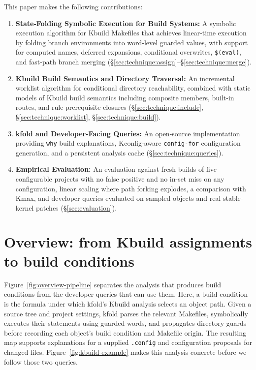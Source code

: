 \documentclass[acmsmall]{acmart}
\newcommand{\tool}{\textsf{kfold}\xspace}
\newcommand{\kmax}{\textsf{Kmax}\xspace}
\begin{document}
This paper makes the following contributions:
\begin{enumerate}
\item \textbf{State-Folding Symbolic Execution for Build Systems:} A symbolic execution algorithm for Kbuild Makefiles that achieves linear-time execution by folding branch environments into word-level guarded values, with support for computed names, deferred expansions, conditional overwrites, \texttt{\$(eval)}, and fast-path branch merging (\S\ref{sec:technique:assign}--\S\ref{sec:technique:merge}).
\item \textbf{Kbuild Build Semantics and Directory Traversal:} An incremental worklist algorithm for conditional directory reachability, combined with static models of Kbuild build semantics including composite members, built-in routes, and rule prerequisite closures (\S\ref{sec:technique:include}, \S\ref{sec:technique:worklist}, \S\ref{sec:technique:build}).
\item \textbf{\tool and Developer-Facing Queries:} An open-source implementation providing \texttt{why} build explanations, Kconfig-aware \texttt{config-for} configuration generation, and a persistent analysis cache (\S\ref{sec:technique:queries}).
\item \textbf{Empirical Evaluation:} An evaluation against fresh builds of five configurable projects with no false positive and no in-set miss on any configuration, linear scaling where path forking explodes, a comparison with \kmax, and developer queries evaluated on sampled objects and real stable-kernel patches (\S\ref{sec:evaluation}).
\end{enumerate}

\section{Overview: from Kbuild assignments to build conditions}\label{overview-from-kbuild-assignments-to-build-conditions}

Figure~\ref{fig:overview-pipeline} separates the analysis that produces build conditions from the developer queries that can use them.
Here, a build condition is the formula under which \tool's Kbuild analysis selects an object path.
Given a source tree and project settings, \tool parses the relevant Makefiles, symbolically executes their statements using guarded words, and propagates directory guards before recording each object's build condition and Makefile origin.
The resulting map supports explanations for a supplied \texttt{.config} and configuration proposals for changed files.
Figure~\ref{fig:kbuild-example} makes this analysis concrete before we follow those two queries.
\end{document}
